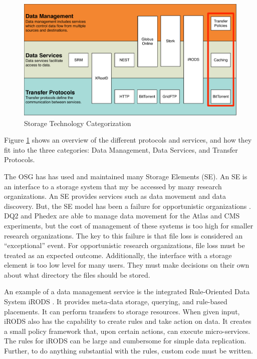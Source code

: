 \begin{figure}[ht!]
	\centering
	\includegraphics[width=\textwidth]{images/BackgroundStorageDiagram2.pdf}
	\caption{Storage Technology Categorization}
	\label{fig:backgroundstorage}
\end{figure}

Figure \ref{fig:backgroundstorage} shows an overview of the different protocols and services, and how they fit into the three categories: Data Management, Data Services, and Transfer Protocols.

The OSG has has used and maintained many Storage Elements (SE).  An SE is an interface to a storage system that my be accessed by many research organizations.  An SE provides services such as data movement and data discovery.  But, the SE model has been a failure for opportunistic organizations \cite{bockelman15stashcache}.  DQ2 \cite{branco2008managing} and Phedex \cite{rehn2006phedex} are able to manage data movement for the Atlas and CMS experiments, but the cost of management of these systems is too high for smaller research organizations.  The key to this failure is that file loss is considered an ``exceptional'' event.  For opportunistic research organizations, file loss must be treated as an expected outcome.  Additionally, the interface with a storage element is too low level for many users.  They must make decisions on their own about what directory the files should be stored.

An example of a data management service is the integrated Rule-Oriented Data System iRODS \cite{rajasekar2010irods}.  It provides meta-data storage, querying, and rule-based placements.  It can perform transfers to storage resources.  When given input, iRODS also has the capability to create rules and take action on data.  It creates a small policy framework that, upon certain actions, can execute micro-services.  The rules for iRODS can be large and cumbersome for simple data replication.  Further, to do anything substantial with the rules, custom code must be written.

